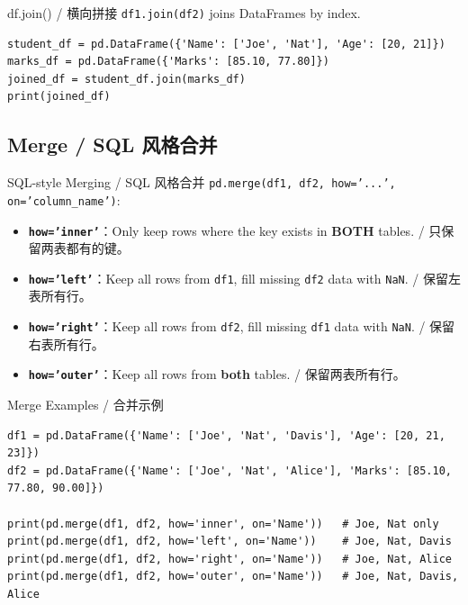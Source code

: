 \documentclass[11pt,a4paper]{report}
\let\oldtexttt\texttt
\renewcommand{\texttt}[1]{\textcolor{mainblue}{\oldtexttt{#1}}}
\begin{document}
\begin{examplebox}{df.join() / 横向拼接}
    \texttt{df1.join(df2)} joins DataFrames by index.
\begin{lstlisting}
student_df = pd.DataFrame({'Name': ['Joe', 'Nat'], 'Age': [20, 21]})
marks_df = pd.DataFrame({'Marks': [85.10, 77.80]})
joined_df = student_df.join(marks_df)
print(joined_df)
\end{lstlisting}
\end{examplebox}

\subsection{Merge / SQL 风格合并}

\begin{concept}{SQL-style Merging / SQL 风格合并}
    \texttt{pd.merge(df1, df2, how='...', on='column\_name')}:
    \begin{itemize}[itemsep=0.5em]
        \item \textbf{\texttt{how='inner'}}：Only keep rows where the key exists in \textbf{BOTH} tables. / 只保留两表都有的键。
        \item \textbf{\texttt{how='left'}}：Keep all rows from \texttt{df1}, fill missing \texttt{df2} data with \texttt{NaN}. / 保留左表所有行。
        \item \textbf{\texttt{how='right'}}：Keep all rows from \texttt{df2}, fill missing \texttt{df1} data with \texttt{NaN}. / 保留右表所有行。
        \item \textbf{\texttt{how='outer'}}：Keep all rows from \textbf{both} tables. / 保留两表所有行。
    \end{itemize}
\end{concept}

\begin{examplebox}{Merge Examples / 合并示例}
\begin{lstlisting}
df1 = pd.DataFrame({'Name': ['Joe', 'Nat', 'Davis'], 'Age': [20, 21, 23]})
df2 = pd.DataFrame({'Name': ['Joe', 'Nat', 'Alice'], 'Marks': [85.10, 77.80, 90.00]})

print(pd.merge(df1, df2, how='inner', on='Name'))   # Joe, Nat only
print(pd.merge(df1, df2, how='left', on='Name'))    # Joe, Nat, Davis
print(pd.merge(df1, df2, how='right', on='Name'))   # Joe, Nat, Alice
print(pd.merge(df1, df2, how='outer', on='Name'))   # Joe, Nat, Davis, Alice
\end{lstlisting}
\end{examplebox}
\end{document}
